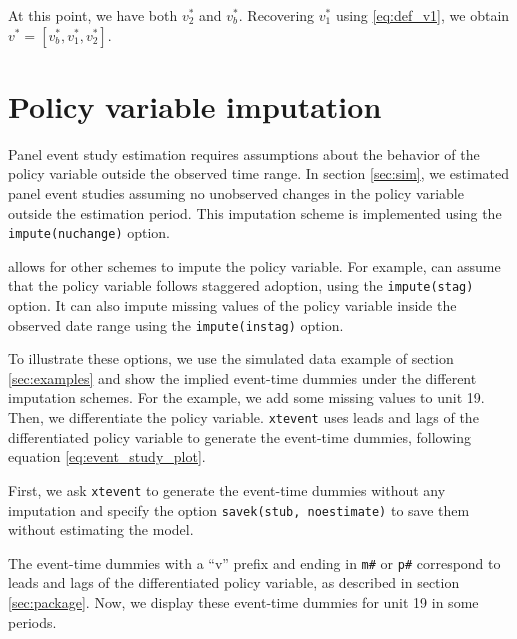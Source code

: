 \documentclass[12pt]{article}
\begin{document}
At this point, we have both $v^*_2$ and $v^*_b$.
Recovering $v^*_1$ using \eqref{eq:def_v1}, we obtain $v^*=[v^*_b, v^*_1,  v^*_2]$.


\section{Policy variable imputation}
\label{sec:impute}

Panel event study estimation requires assumptions about the behavior of the policy variable outside the observed time range.
In section \ref{sec:sim}, we estimated panel event studies assuming no unobserved changes in the policy variable outside the estimation period.
This imputation scheme is implemented using the \texttt{impute(nuchange)} option.

\xtevent allows for other schemes to impute the policy variable.
For example, \xtevent can assume that the policy variable follows staggered adoption, using the \texttt{impute(stag)} option.
It can also impute missing values of the policy variable inside the observed date range using the \texttt{impute(instag)} option.

To illustrate these options, we use the simulated data example of section \ref{sec:examples} and show the implied event-time dummies under the different imputation schemes.
For the example, we add some missing values to unit 19.
Then, we differentiate the policy variable.
\texttt{xtevent} uses leads and lags of the differentiated policy variable to generate the event-time dummies, following equation \eqref{eq:event_study_plot}.

First, we ask \texttt{xtevent} to generate the event-time dummies without any imputation and specify the option \texttt{savek(stub, noestimate)} to save them without estimating the model.

\begin{stlog}
	\nullskip
\end{stlog}

The event-time dummies with a ``v'' prefix and ending in \texttt{m\#} or \texttt{p\#} correspond to leads and lags of the differentiated policy variable, as described in section \ref{sec:package}.
Now, we display these event-time dummies for unit 19 in some periods.

\begin{stlog}
	\nullskip
\end{stlog}
\end{document}
